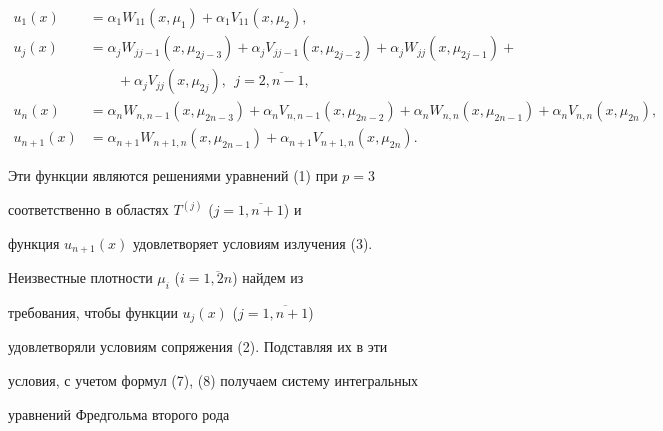 \begin{equation}


\begin{split}


u_1(x)&=\alpha_1W_{11}(x,\mu_1)+\alpha_1V_{11}(x,\mu_2),\\


u_j(x)&=\alpha_jW_{jj-1}(x,\mu_{2j-3})+\alpha_jV_{jj-1}(x,


\mu_{2j-2})+ \alpha_jW_{jj}(x,


\mu_{2j-1})+\\


&\qquad +\alpha_jV_{jj}(x, \mu_{2j}),\ \ j=\overline{2,n-1}, \\


u_n(x)&=\alpha_nW_{n,n-1}(x, \mu_{2n-3})+\alpha_nV_{n,n-1}(x,


\mu_{2n-2})+ \alpha_nW_{n,n}(x,


\mu_{2n-1})+\alpha_nV_{n,n}(x,\mu_{2n}),\\


u_{n+1}(x)&=\alpha_{n+1}W_{n+1,n}(x,


\mu_{2n-1})+\alpha_{n+1}V_{n+1,n}(x,\mu_{2n}).


\end{split}


\end{equation}





Эти функции являются решениями уравнений (1) при $p=3$


соответственно в областях $T^{(j)}$ ($j=\overline{1,n+1}$) и


функция $u_{n+1}(x)$ удовлетворяет условиям излучения (3).


Неизвестные плотности $\mu_i$ ($i=\overline{1,2n}$) найдем из


требования, чтобы функции $ u_j(x)$ ($j=\overline{1,n+1}$)


удовлетворяли условиям сопряжения (2). Подставляя их в эти


условия, с учетом формул (7), (8) получаем систему интегральных


уравнений Фредгольма второго рода


